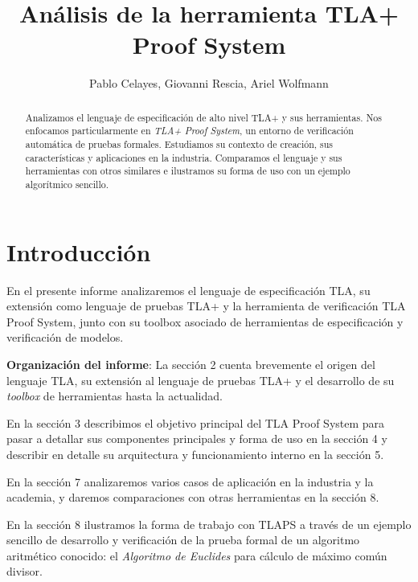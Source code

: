 \documentclass[spanish]{llncs}
\begin{document}
%

\mainmatter              %
%
\title{Análisis de la herramienta TLA+ Proof System}
%
%
\author{Pablo Celayes, Giovanni Rescia, Ariel Wolfmann}

%

\maketitle              %

\begin{abstract}
Analizamos el lenguaje de especificación de alto nivel TLA+ y sus herramientas.
Nos enfocamos particularmente en \textit{TLA+ Proof System}, un entorno de verificación automática de pruebas formales.
Estudiamos su contexto de creación, sus características y aplicaciones en la industria.
Comparamos el lenguaje y sus herramientas con otros similares e ilustramos su forma de uso con un ejemplo algorítmico sencillo.
\end{abstract}
%

\section{Introducción}

En el presente informe analizaremos el lenguaje de especificación TLA, su extensión como lenguaje de pruebas TLA+
y la herramienta de verificación TLA Proof System, junto con su toolbox asociado de herramientas de especificación
y verificación de modelos.

\textbf{Organización del informe}: La sección 2 cuenta brevemente el origen del lenguaje TLA,
su extensión al lenguaje de pruebas TLA+ y el desarrollo de su \textit{toolbox} de herramientas hasta la actualidad.

En la sección 3 describimos el objetivo principal del TLA Proof System para pasar a detallar sus componentes principales y forma de uso en la sección 4
y describir en detalle su arquitectura y funcionamiento interno en la sección 5.

En la sección 7 analizaremos varios casos de aplicación en la industria y la academia, y daremos comparaciones con otras herramientas en la sección 8.

En la sección 8 ilustramos la forma de trabajo con TLAPS a través de un ejemplo sencillo de desarrollo y verificación de la prueba formal de un
algoritmo aritmético conocido: el \textit{Algoritmo de Euclides} para cálculo de máximo común divisor.
\end{document}
